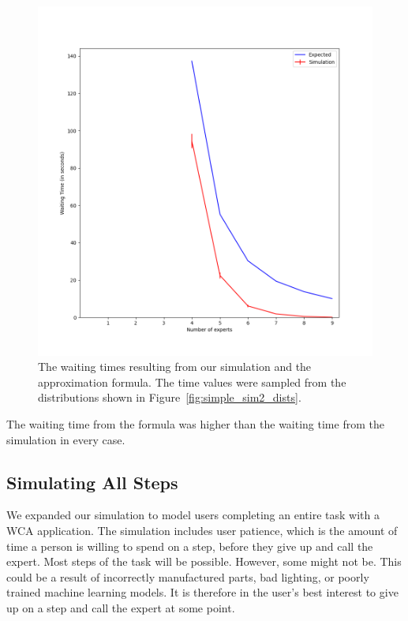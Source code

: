 \begin{figure}[h]
  \includegraphics[width=\textwidth]{figures/montecarlo/independent_calls_expon.png}
  \caption{
    The waiting times resulting from our simulation and the approximation
    formula.
    The time values were sampled from the distributions shown in
    Figure~\ref{fig:simple_sim2_dists}.
  }\label{fig:simple_sim2_results}
\end{figure}

The waiting time from the formula was higher than the waiting time from
the simulation in every case.

\subsection{Simulating All Steps}

We expanded our simulation to model users completing an entire task with a WCA
application.
The simulation includes user patience, which is the amount of time a person is
willing to spend on a step, before they give up and call the expert.
Most steps of the task will be possible.
However, some might not be.
This could be a result of incorrectly manufactured parts, bad lighting, or
poorly trained machine learning models.
It is therefore in the user's best interest to give up on a step and call the
expert at some point.

